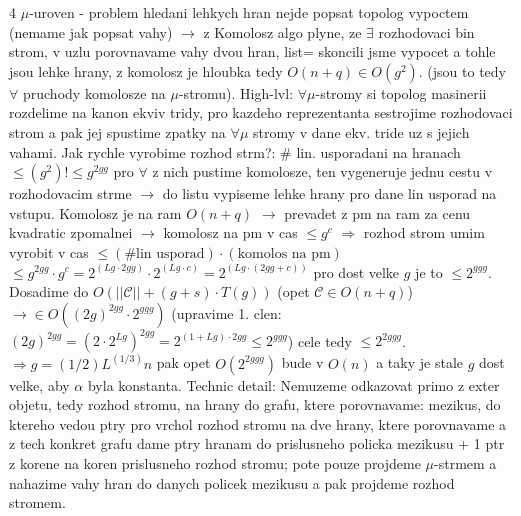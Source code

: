 \documentclass[8pt]{extarticle}
\begin{document}
\begin{multicols*}{4}
$\mu$-uroven - problem hledani lehkych hran nejde popsat topolog vypoctem (nemame jak popsat vahy) $\rightarrow$ z Komolosz algo plyne, ze $\exists$ rozhodovaci bin strom, v uzlu porovnavame vahy dvou hran, list= skoncili jsme vypocet a tohle jsou lehke hrany, z komolosz je hloubka tedy $O(n+q) \in O(g^2)$. (jsou to tedy $\forall$ pruchody komolosze na $\mu$-stromu). High-lvl: $\forall \mu$-stromy si topolog masinerii rozdelime na kanon ekviv tridy, pro kazdeho reprezentanta sestrojime rozhodovaci strom a pak jej spustime zpatky na $\forall \mu$ stromy v dane ekv. tride uz s jejich vahami. Jak rychle vyrobime rozhod strm?: \# lin. usporadani na hranach $\leq (g^2)! \leq g^{2gg}$ pro $\forall$ z nich pustime komolosze, ten vygeneruje jednu cestu v rozhodovacim strme $\rightarrow$ do listu vypiseme lehke hrany pro dane lin usporad na vstupu. Komolosz je na ram $O(n+q)$ $\rightarrow$ prevadet z pm na ram za cenu kvadratic zpomalnei $\rightarrow$ komolosz na pm v cas $\leq g^c$ $\Rightarrow$ rozhod strom umim vyrobit v cas $\leq (\#\text{lin usporad})\cdot(\text{komolos na pm})$ $\leq g^{2gg}\cdot g^c = 2^{(Lg \cdot2gg)} \cdot 2^{(Lg \cdot c)} = 2^{(Lg \cdot(2gg+c))}$ pro dost velke $g$ je to $\leq 2^{ggg}$. Dosadime do $O(||\mathcal{C}|| + (g+s) \cdot T(g))$ (opet $\mathcal{C} \in O(n+q)$) $\rightarrow \in O((2g)^{2gg} \cdot 2^{ggg})$ (upravime 1. clen: $(2g)^{2gg} = (2\cdot2^{Lg})^{2gg} = 2^{(1+Lg)\cdot2gg}\leq2^{ggg}$) cele tedy $\leq 2^{2ggg}$. $\Rightarrow g=(1/2)L^{(1/3)}n$ pak opet $O(2^{2ggg})$ bude v $O(n)$ a taky je stale $g$ dost velke, aby $\alpha$ byla konstanta. Technic detail: Nemuzeme odkazovat primo z exter objetu, tedy rozhod stromu, na hrany do grafu, ktere porovnavame: mezikus, do ktereho vedou ptry pro vrchol rozhod stromu na dve hrany, ktere porovnavame a z tech konkret grafu dame ptry hranam do prislusneho policka mezikusu + 1 ptr z korene na koren prislusneho rozhod stromu; pote pouze projdeme $\mu$-strmem a nahazime vahy hran do danych policek mezikusu a pak projdeme rozhod stromem.

\end{multicols*}
\end{document}
